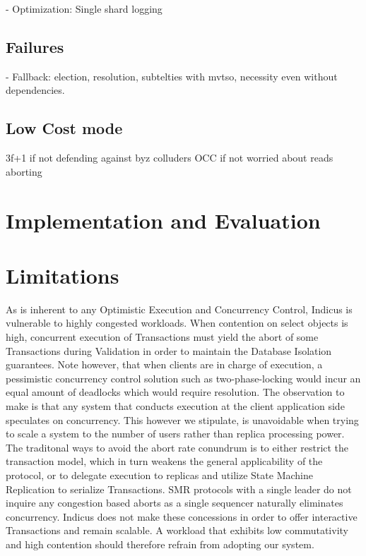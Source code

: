- Optimization: Single shard logging
\subsection{Failures}
- Fallback: election, resolution, subtelties with mvtso, necessity even without dependencies.

\subsection{Low Cost mode}
3f+1 if not defending against byz colluders
OCC if not worried about reads aborting


\section{Implementation and Evaluation}


\section{Limitations}
As is inherent to any Optimistic Execution and Concurrency Control, Indicus is vulnerable to highly congested workloads. When contention on select objects is high, concurrent execution of Transactions must yield the abort of some Transactions during Validation in order to maintain the Database Isolation guarantees. Note however, that when clients are in charge of execution, a pessimistic concurrency control solution such as two-phase-locking would incur an equal amount of deadlocks which would require resolution. The observation to make is that any system that conducts execution at the client application side speculates on concurrency. This however we stipulate, is unavoidable when trying to scale a system to the number of users rather than replica processing power. The traditonal ways to avoid the abort rate conundrum is to either restrict the transaction model, which in turn weakens the general applicability of the protocol, or to delegate execution to replicas and utilize State Machine Replication to serialize Transactions. SMR protocols with a single leader do not inquire any congestion based aborts as a single sequencer naturally eliminates concurrency.
Indicus does not make these concessions in order to offer interactive Transactions and remain scalable. A workload that exhibits low commutativity and high contention should therefore refrain from adopting our system.

